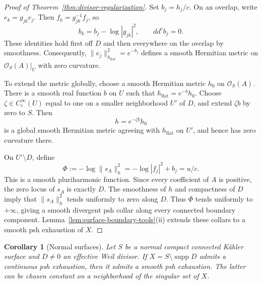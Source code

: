 \documentclass[11pt]{amsart}
\newtheorem{corollary}[theorem]{Corollary}
\theoremstyle{definition}
\theoremstyle{remark}
\numberwithin{equation}{section}
\newcommand{\OO}{\mathcal O}
\newcommand{\ddc}{dd^c}
\newcommand{\supp}{\operatorname{supp}}
\begin{document}
\begin{proof}[Proof of Theorem~\ref{thm:divisor-regularization}]
Set $b_j=h_j/c$. On an overlap, write $e_k=g_{jk}e_j$.
Then $f_k=g_{jk}^{-1}f_j$, so
\[
 b_k=b_j-\log|g_{jk}|^2,\qquad \ddc b_j=0.
\]
These identities hold first off $D$ and then everywhere on the
overlap by smoothness. Consequently,
$\|e_j\|_{h_{\mathrm{flat}}}^2=e^{-b_j}$ defines a smooth Hermitian
metric on $\OO_S(A)|_U$ with zero curvature.

To extend the metric globally, choose a smooth Hermitian metric
$h_0$ on $\OO_S(A)$. There is a smooth real function $b$ on $U$
such that $h_{\mathrm{flat}}=e^{-b}h_0$.
Choose $\zeta\in C_c^\infty(U)$ equal to one on a smaller
neighborhood $U'$ of $D$, and extend $\zeta b$ by zero to $S$.
Then
\[
 h=e^{-\zeta b}h_0
\]
is a global smooth Hermitian metric agreeing with
$h_{\mathrm{flat}}$ on $U'$, and hence has zero curvature there.

On $U'\setminus D$, define
\[
 \Phi:=-\log\|s_A\|_h^2
      =-\log|f_j|^2+b_j=u/c.
\]
This is a smooth pluriharmonic function. Since every coefficient
of $A$ is positive, the zero locus of $s_A$ is exactly $D$.
The smoothness of $h$ and compactness of $D$ imply that
$\|s_A\|_h^2$ tends uniformly to zero along $D$.
Thus $\Phi$ tends uniformly to $+\infty$, giving a smooth
divergent psh collar along every connected boundary component.
Lemma~\ref{lem:surface-boundary-tools}\textup{(ii)} extends these
collars to a smooth psh exhaustion of $X$.
\end{proof}

\begin{corollary}[Normal surfaces]
\label{cor:normal-divisor-regularization}
Let $S$ be a normal compact connected K\"ahler surface and $D\ne0$
an effective Weil divisor. If $X=S\setminus\supp D$ admits a
continuous psh exhaustion, then it admits a smooth psh exhaustion.
The latter can be chosen constant on a neighborhood of the singular
set of $X$.
\end{corollary}
\end{document}
